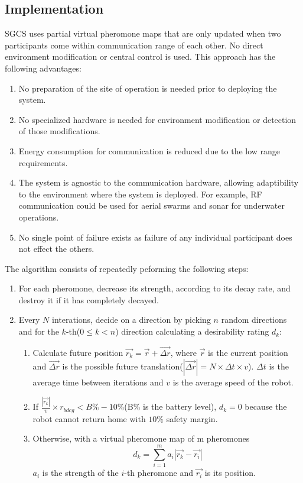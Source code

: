 \documentclass[a4paper, 12pt, times]{article}
\begin{document}
\begin{multicols}{2}
\section{Implementation}
SGCS uses partial virtual pheromone maps that are only updated when two participants come within communication range of each other. No direct environment modification or central control is used. This approach has the following advantages: 
\begin{enumerate}
\item No preparation of the site of operation is needed prior to deploying the system.
\item No specialized hardware is needed for environment modification or detection of those modifications.
\item Energy consumption for communication is reduced due to the low range requirements.
\item The system is agnostic to the communication hardware, allowing adaptibility to the environment where the system is deployed. For example, RF communication could be used for aerial swarms and sonar for underwater operations.
\item No single point of failure exists as failure of any individual participant does not effect the others.
\end{enumerate}
The algorithm consists of repeatedly peforming the following steps:
	\begin{enumerate}
		\item For each pheromone, decrease its strength, according to its decay rate, and destroy it if it has completely decayed. 
		\item Every $N$ interations, decide on a direction by picking $n$ random directions and for the $k$-th($0\le k<n$) direction calculating a desirability rating $d_k$:
		\begin{enumerate}
			\item Calculate future position $\vec{r_k}=\vec{r} + \vec{\Delta r}$, where $\vec{r}$ is the current position and $\vec{\Delta r}$ is the possible future translation($|\vec{\Delta r}|=N \times \Delta t \times v$). $\Delta t$ is the average time between iterations and $v$ is the average speed of the robot. 
			\item If $\frac{|\vec{r_k}|}{v} \times r_{bdcg} < B\%-10\%$(B\% is the battery level), $d_k=0$ because the robot cannot return home with $10\%$ safety margin.
			\item Otherwise, with a virtual pheromone map of m pheromones $$d_k = \sum_{i=1}^m {a_i|\vec{r_k}-\vec{r_{i}}|}$$ $a_i$ is the strength of the $i$-th pheromone and $\vec{r_{i}}$ is its position.

\end{enumerate}
\end{enumerate}
\end{multicols}
\end{document}

